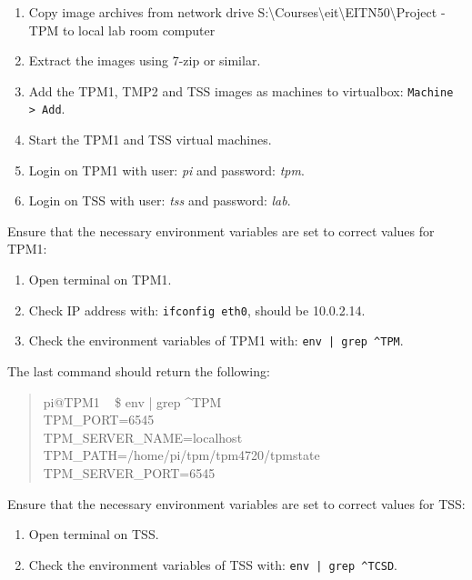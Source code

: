 \documentclass[10pt]{article}
\newcommand{\command}[1]{\texttt{#1}}
\begin{document}
      \begin{enumerate}
        \item{Copy image archives from network drive S:\textbackslash Courses\textbackslash eit\textbackslash EITN50\textbackslash Project - TPM to
          local lab room computer}
        \item{Extract the images using 7-zip or similar.}
        \item{Add the TPM1, TMP2 and TSS images as machines to virtualbox:
          \command{Machine > Add}.}
        \item{Start the TPM1 and TSS virtual machines.}
        \item{Login on TPM1 with user: \emph{pi} and password: \emph{tpm}.}
        \item{Login on TSS with user: \emph{tss} and password: \emph{lab}.}
      \end{enumerate}

      Ensure that the necessary environment variables are set to correct values
      for TPM1:

      \begin{enumerate}
        \item{Open terminal on TPM1.}
        \item{Check IP address with: \command{ifconfig eth0}, should be 10.0.2.14.}
        \item{Check the environment variables of TPM1 with: \command{env | grep
          \textasciicircum TPM}.}
      \end{enumerate}

      The last command should return the following:
      \begin{quote}
        pi@TPM1 ~ \$ env | grep \textasciicircum TPM\\
        TPM\_PORT=6545\\
        TPM\_SERVER\_NAME=localhost\\
        TPM\_PATH=/home/pi/tpm/tpm4720/tpmstate\\
        TPM\_SERVER\_PORT=6545
      \end{quote}

      Ensure that the necessary environment variables are set to correct values
      for TSS:

      \begin{enumerate}
        \item{Open terminal on TSS.}
        \item{Check the environment variables of TSS with: \command{env | grep
          \textasciicircum TCSD}.}
      \end{enumerate}
\end{document}
